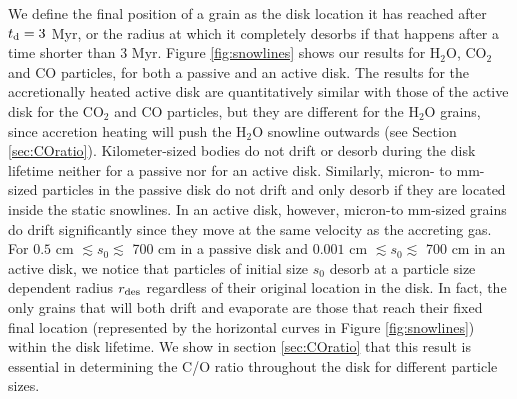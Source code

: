 \documentclass[apj]{emulateapj}
\begin{document}
We define the final position of a grain as the disk location it has reached after $t_{\rm d}=3$ Myr, or the radius at which it completely desorbs if that happens after a time shorter than 3 Myr.  Figure \ref{fig:snowlines} shows our results for H$_2$O, CO$_2$ and CO particles, for both a passive and an active disk. The results for the accretionally heated active disk are quantitatively similar with those of the active disk for the CO$_2$ and CO particles, but they are different for the H$_2$O grains, since accretion heating will push the H$_2$O snowline outwards (see Section \ref{sec:COratio}). %
Kilometer-sized bodies do not drift or desorb during the disk lifetime neither for a passive nor for an active disk. Similarly, micron- to mm-sized particles in the passive disk do not drift and only %
desorb if %
they are located inside the static snowlines. %
In an active disk, however, micron-to mm-sized grains do drift significantly since they move at the same velocity as the accreting gas. For $0.5$ cm $\lesssim s_0 \lesssim$ 700 cm in a passive disk and $0.001$ cm $\lesssim s_0 \lesssim$ 700 cm in an active disk, we notice that particles of initial size $s_0$ desorb at a %
particle size dependent radius $r_{\rm des}$ regardless of their original location in the disk. In fact, the only grains that will both drift and evaporate are those that reach their fixed final location (represented by the horizontal curves in Figure \ref{fig:snowlines}) within the disk lifetime. We show in section \ref{sec:COratio} that this result is essential in determining the C/O ratio throughout the disk for different particle sizes. 
\end{document}
